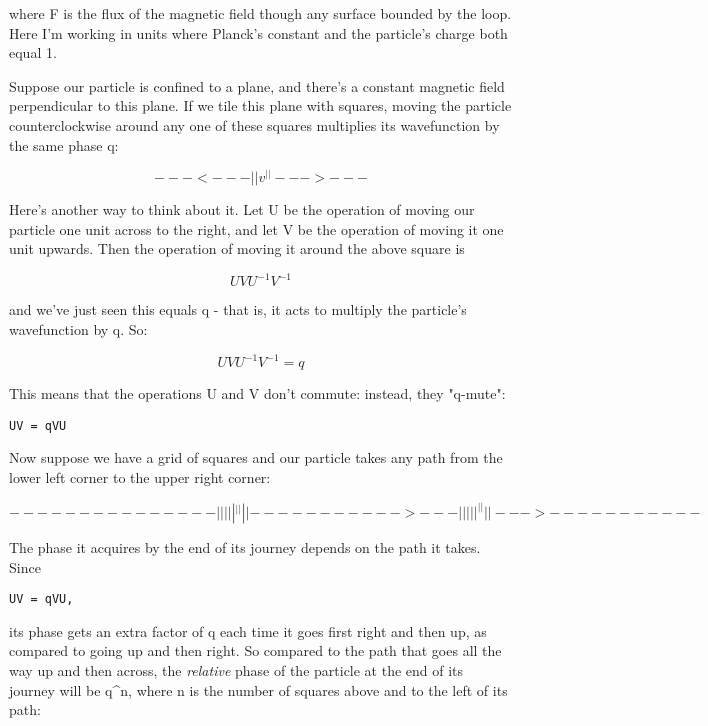 where F is the flux of the magnetic field though any surface bounded 
by the loop.  Here I'm working in units where Planck's constant and the 
particle's charge both equal 1.  

Suppose our particle is confined to a plane, and there's a constant
magnetic field perpendicular to this plane.   If we tile this plane 
with squares, moving the particle counterclockwise around any one of 
these squares multiplies its wavefunction by the same phase q:

$$
              ---<---
             |       |
             v       ^
             |       |
              --->---
$$
    
Here's another way to think about it.  Let U be the operation of moving
our particle one unit across to the right, and let V be the operation of
moving it one unit upwards.  Then the operation of moving it around the
above square is

$$
U V U^{-1} V^{-1} 
$$
    
and we've just seen this equals q - that is, it acts to multiply
the particle's wavefunction by q.  So:

$$
U V U^{-1} V^{-1} = q
$$
    
This means that the operations U and V don't commute: instead, 
they "q-mute":

\begin{verbatim}
UV = qVU
\end{verbatim}
    
Now suppose we have a grid of squares and our particle takes any path
from the lower left corner to the upper right corner:

$$
                ---------------
               |       |       |
               |       |       ^
               |       |       |
               |----------->---|
               |       |       |
               |       ^       |
               |       |       | 
                --->-----------
$$
    
The phase it acquires by the end of its journey depends on the path it 
takes.  Since 

\begin{verbatim}
UV = qVU, 
\end{verbatim}
    
its phase gets an extra factor of q each time it goes first right and
then up, as compared to going up and then right.  So compared to the
path that goes all the way up and then across, the \emph{relative} phase 
of the particle at the end of its journey will be q^{n}, where n is the
number of squares above and to the left of its path:

